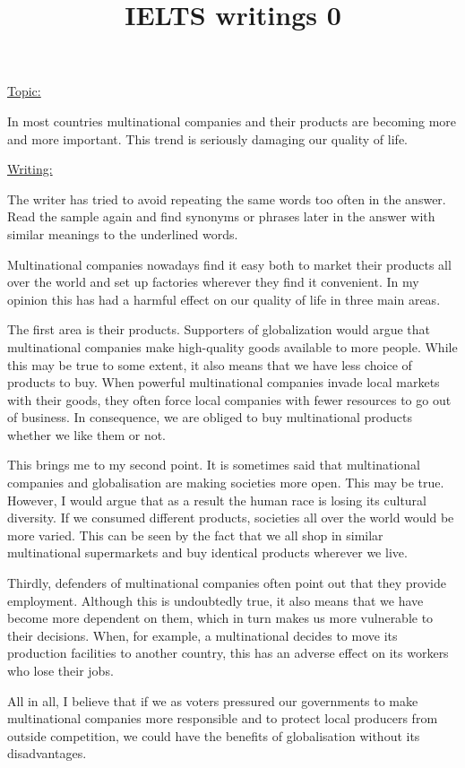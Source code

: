 \documentclass[UTF8]{ctexart}
\title{IELTS writings 0}
\date{}
\begin{document}
\pagestyle{plain}
\maketitle
\noindent
\LARGE{\underline{Topic:}}

\normalsize{In most countries multinational companies and their products are becoming more and more important.
This trend is seriously damaging our quality of life.}

\noindent
\LARGE{\underline{Writing:}}

\normalsize{The writer has tried to avoid repeating the same words too often in the answer.
Read the sample again and find synonyms or phrases later in the answer with similar meanings to the underlined words.

Multinational companies nowadays find it easy both to market their products all over the world and set up factories wherever they find it convenient. In my opinion this has had a harmful effect on our quality of life in three main areas.

The first area is their products. Supporters of globalization would argue that multinational companies make high-quality goods available to more people. While this may be true to some extent, it also means that we have less choice of products to buy. When powerful multinational companies invade local markets with their goods, they often force local companies with fewer resources to go out of business. In consequence, we are obliged to buy multinational products whether we like them or not.

This brings me to my second point. It is sometimes said that multinational companies and globalisation are making societies more open. This may be true. However, I would argue that as a result the human race is losing its cultural diversity. If we consumed different products, societies all over the world would be more varied. This can be seen by the fact that we all shop in similar multinational supermarkets and buy identical products wherever we live.

Thirdly, defenders of multinational companies often point out that they provide employment. Although this is undoubtedly true, it also means that we have become more dependent on them, which in turn makes us more vulnerable to their decisions. When, for example, a multinational decides to move its production facilities to another country, this has an adverse effect on its workers who lose their jobs.

All in all, I believe that if we as voters pressured our governments to make multinational companies more responsible and to protect local producers from outside competition, we could have the benefits of globalisation without its disadvantages.}
\end{document}
